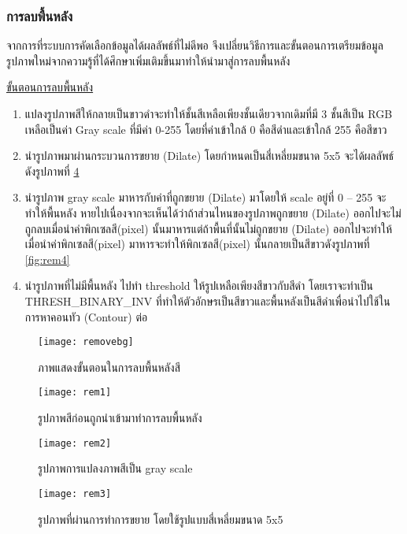 \subsubsection{การลบพื้นหลัง}

จากการที่ระบบการคัดเลือกข้อมูลได้ผลลัพธ์ที่ไม่ดีพอ จึงเปลี่ยนวิธีการและขั้นตอนการเตรียมข้อมูลรูปภาพใหม่จากความรู้ที่ได้ศึกษาเพิ่มเติมขึ้นมาทำให้นำมาสู่การลบพื้นหลัง

\underline{ขั้นตอนการลบพื้นหลัง}

\begin{enumerate}
    \item แปลงรูปภาพสีให้กลายเป็นขาวดำจะทำให้ชั้นสีเหลือเพียงชั้นเดียวจากเดิมที่มี 3 ชั้นสีเป็น RGB เหลือเป็นค่า Gray scale ที่มีค่า 0-255 โดยที่ค่าเข้าใกล้ 0 คือสีดำและเข้าใกล้ 255 คือสีขาว
    \item นำรูปภาพมาผ่านกระบวนการขยาย (Dilate) โดยกำหนดเป็นสี่เหลี่ยมขนาด 5x5 จะได้ผลลัพธ์ดังรูปภาพที่ \ref{fig:rem3}
    \item นำรูปภาพ gray scale มาหารกับค่าที่ถูกขยาย (Dilate) มาโดยให้ scale อยู่ที่ 0 – 255 จะทำให้พื้นหลัง หายไปเนื่องจากจะเห็นได้ว่าถ้าส่วนไหนของรูปภาพถูกขยาย (Dilate) ออกไปจะไม่ถูกลบเมื่อนำค่าพิกเซลสี(pixel) นั้นมาหารแต่ถ้าพื้นที่นั้นไม่ถูกขยาย (Dilate) ออกไปจะทำให้เมื่อนำค่าพิกเซลสี(pixel) มาหารจะทำให้พิกเซลสี(pixel) นั้นกลายเป็นสีขาวดังรูปภาพที่ \ref{fig:rem4}
    \item นำรูปภาพที่ไม่มีพื้นหลัง ไปทำ threshold ให้รูปเหลือเพียงสีขาวกับสีดำ โดยเราจะทำเป็น THRESH\_BINARY\_INV ที่ทำให้ตัวอักษรเป็นสีขาวและพื้นหลังเป็นสีดำเพื่อนำไปใช้ในการหาคอนทัว (Contour) ต่อ
    \end{enumerate}

\begin{figure}[H]
    \centering
    \texttt{[image: removebg]}
    \caption{ภาพแสดงขั้นตอนในการลบพื้นหลังสี}\label{fig:removebg}
\end{figure}

\begin{figure}[H]
    \centering
    \texttt{[image: rem1]}
    \caption{รูปภาพสีก่อนถูกนำเข้ามาทำการลบพื้นหลัง}\label{fig:rem1}
\end{figure}

\begin{figure}[H]
    \centering
    \texttt{[image: rem2]}
    \caption{รูปภาพการแปลงภาพสีเป็น gray scale}\label{fig:rem2}
\end{figure}

\begin{figure}[H]
    \centering
    \texttt{[image: rem3]}
    \caption{รูปภาพที่ผ่านการทำการขยาย โดยใช้รูปแบบสี่เหลี่ยมขนาด 5x5}\label{fig:rem3}
\end{figure}

